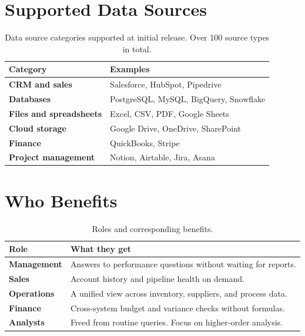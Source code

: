 \documentclass[12pt, a4paper]{article}
\begin{document}
\section*{Supported Data Sources}

\begin{table}[h]
\centering
\begin{tabular}{>{\bfseries}ll}
  \toprule
  Category & Examples \\
  \midrule
  CRM and sales          & Salesforce, HubSpot, Pipedrive \\
  Databases              & PostgreSQL, MySQL, BigQuery, Snowflake \\
  Files and spreadsheets & Excel, CSV, PDF, Google Sheets \\
  Cloud storage          & Google Drive, OneDrive, SharePoint \\
  Finance                & QuickBooks, Stripe \\
  Project management     & Notion, Airtable, Jira, Asana \\
  \bottomrule
\end{tabular}
\caption{Data source categories supported at initial release. Over 100 source
types in total.}
\end{table}

\section*{Who Benefits}

\begin{table}[h]
\centering
\begin{tabular}{>{\bfseries}lp{9cm}}
  \toprule
  Role & What they get \\
  \midrule
  Management  & Answers to performance questions without waiting for reports. \\[4pt]
  Sales       & Account history and pipeline health on demand. \\[4pt]
  Operations  & A unified view across inventory, suppliers, and process data. \\[4pt]
  Finance     & Cross-system budget and variance checks without formulas. \\[4pt]
  Analysts    & Freed from routine queries. Focus on higher-order analysis. \\
  \bottomrule
\end{tabular}
\caption{Roles and corresponding benefits.}
\end{table}
\end{document}
